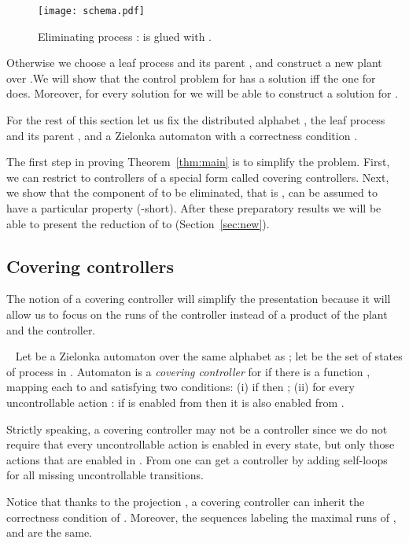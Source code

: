 \documentclass[10pt,a4paper]{article}
\newcommand{\igw}[1]{}
\begin{document}
 \begin{figure}[htb]
\centerline{ \texttt{[image: schema.pdf]}}
\caption{Eliminating process :  is glued with .}   
   \label{fig:schema}
 \end{figure}

Otherwise we choose a leaf process
 and its parent , and construct a new plant  over .We will show that the control
problem for  
has a solution iff the one for  does. Moreover, for
every solution for  we will be able to construct a solution
for . 


For the rest of this section let us fix the distributed alphabet
, 
the leaf process  and
its parent , and  a Zielonka automaton with a correctness
condition .


The first step in proving Theorem~\ref{thm:main} is to simplify the
problem. First,  we can restrict to controllers of a special form
called covering controllers. Next, we show that the component of 
to be eliminated, that is , can be assumed to have a particular property
(-short). After these preparatory results we will be able to present
the reduction of  to  (Section~\ref{sec:new}).

\subsection{Covering controllers}


The notion of a covering controller will simplify the presentation
because it will allow us to focus on the runs of the controller
instead of a product of the plant and the controller.\igw{refer to the
  example}

\begin{definition}~\label{df:covering controller}
  Let  be a Zielonka automaton over the same alphabet as ;
  let  be the set of states of process  in . 
  Automaton  is a \emph{covering controller} for  if
  there is a function , mapping each  to  and satisfying two conditions:
  (i)  if  then
  ; (ii) for
  every uncontrollable action : if  is enabled from
   then it is also enabled from .
\end{definition}


\begin{remark} Strictly speaking, a covering controller  may not be a
controller since we  do not require that every uncontrollable action
is enabled in every state, but only those actions that are enabled
in . From  one can get a controller  by adding
self-loops for all missing uncontrollable transitions. 

Notice that thanks to the projection , a covering controller can
inherit the correctness condition of . Moreover, the sequences
labeling the maximal runs
of ,  and  are the same.
\end{remark}
\end{document}

